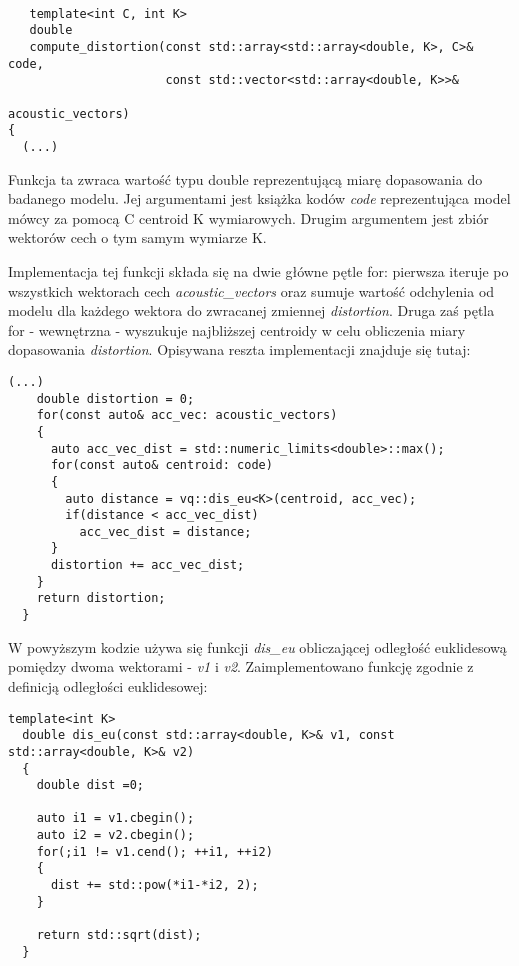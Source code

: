 \begin{lstlisting}[style=lst:cpp, caption=Implementacja funkcji \textit{compute\_distortion}\label{lst:distortion}]

   template<int C, int K>
   double
   compute_distortion(const std::array<std::array<double, K>, C>& code,
                      const std::vector<std::array<double, K>>&
                                                       acoustic_vectors)
{
  (...)
\end{lstlisting}
Funkcja ta zwraca wartość typu double reprezentującą miarę dopasowania do badanego modelu. Jej argumentami jest książka kodów \textit{code} reprezentująca model mówcy za pomocą C centroid K wymiarowych. Drugim argumentem jest zbiór wektorów cech o tym samym wymiarze K. 

  Implementacja tej funkcji składa się na dwie główne pętle for: pierwsza iteruje po wszystkich wektorach cech \textit{acoustic\_vectors} oraz sumuje wartość odchylenia od modelu dla każdego wektora do zwracanej zmiennej \textit{distortion}. Druga zaś pętla for - wewnętrzna - wyszukuje najbliższej centroidy w celu obliczenia miary dopasowania \textit{distortion}. Opisywana reszta implementacji znajduje się tutaj: 

\begin{lstlisting}[style=lst:cpp, caption=Ciało funkcji \textit{compute\_distortion}\label{lst:distortionbody}]
    (...)
    double distortion = 0;
    for(const auto& acc_vec: acoustic_vectors)
    {
      auto acc_vec_dist = std::numeric_limits<double>::max();
      for(const auto& centroid: code)
      {
        auto distance = vq::dis_eu<K>(centroid, acc_vec);
        if(distance < acc_vec_dist)
          acc_vec_dist = distance;
      }
      distortion += acc_vec_dist;
    }
    return distortion;    
  }
\end{lstlisting}

W powyższym kodzie używa się funkcji \textit{dis\_eu} obliczającej odległość euklidesową pomiędzy dwoma wektorami - \textit{v1} i \textit{v2}. Zaimplementowano funkcję zgodnie z definicją odległości euklidesowej:

\begin{lstlisting}[style=lst:cpp, caption=Funkcja \textit{dis\_eu}\label{lst:eu}]
  template<int K>
  double dis_eu(const std::array<double, K>& v1, const std::array<double, K>& v2)
  {
    double dist =0;

    auto i1 = v1.cbegin();
    auto i2 = v2.cbegin();
    for(;i1 != v1.cend(); ++i1, ++i2)
    {
      dist += std::pow(*i1-*i2, 2); 
    } 

    return std::sqrt(dist);
  }
\end{lstlisting}

